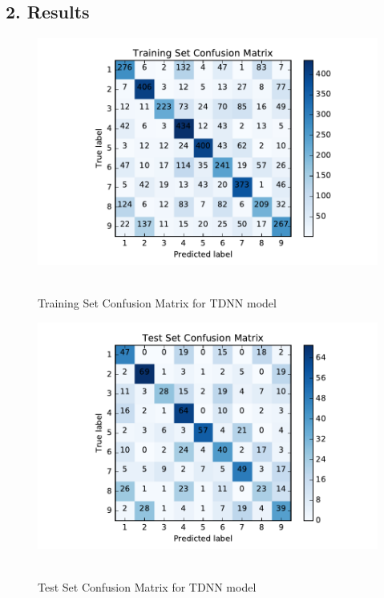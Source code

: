 \subsection*{\large 2. Results}

\begin{figure}[H]
\centering
\includegraphics[width=1.0\textwidth]{./figures/requiredTDNNtrain.pdf}\
\caption{\label{fig:TDNNtrainMatrix} Training Set Confusion Matrix for TDNN model}
\end{figure}


\begin{figure}[H]
\centering
\includegraphics[width=1.0\textwidth]{./figures/requiredTDNNtest.pdf}\
\caption{\label{fig:TDNNtestMatrix} Test Set Confusion Matrix for TDNN model}
\end{figure}



